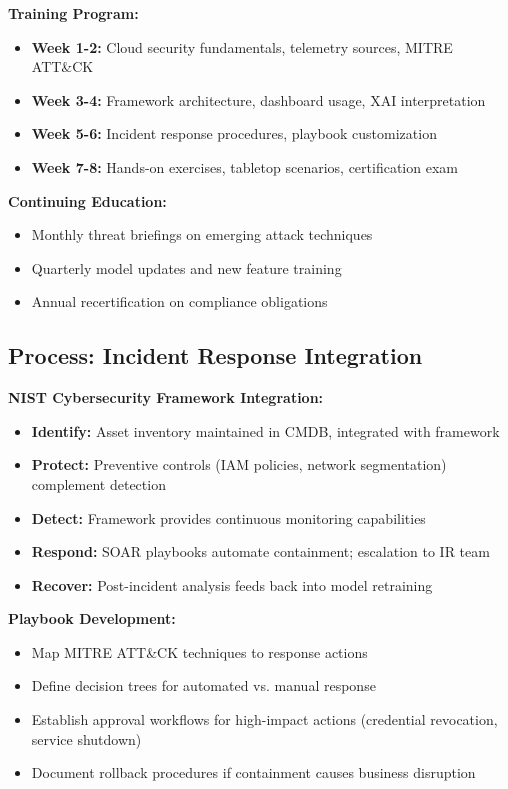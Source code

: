 \textbf{Training Program:}
\begin{itemize}
    \item \textbf{Week 1-2:} Cloud security fundamentals, telemetry sources, MITRE ATT\&CK
    \item \textbf{Week 3-4:} Framework architecture, dashboard usage, XAI interpretation
    \item \textbf{Week 5-6:} Incident response procedures, playbook customization
    \item \textbf{Week 7-8:} Hands-on exercises, tabletop scenarios, certification exam
\end{itemize}

\textbf{Continuing Education:}
\begin{itemize}
    \item Monthly threat briefings on emerging attack techniques
    \item Quarterly model updates and new feature training
    \item Annual recertification on compliance obligations
\end{itemize}

\subsection{Process: Incident Response Integration}
\textbf{NIST Cybersecurity Framework Integration:}
\begin{itemize}
    \item \textbf{Identify:} Asset inventory maintained in CMDB, integrated with framework
    \item \textbf{Protect:} Preventive controls (IAM policies, network segmentation) complement detection
    \item \textbf{Detect:} Framework provides continuous monitoring capabilities
    \item \textbf{Respond:} SOAR playbooks automate containment; escalation to IR team
    \item \textbf{Recover:} Post-incident analysis feeds back into model retraining
\end{itemize}

\textbf{Playbook Development:}
\begin{itemize}
    \item Map MITRE ATT\&CK techniques to response actions
    \item Define decision trees for automated vs. manual response
    \item Establish approval workflows for high-impact actions (credential revocation, service shutdown)
    \item Document rollback procedures if containment causes business disruption
\end{itemize}

